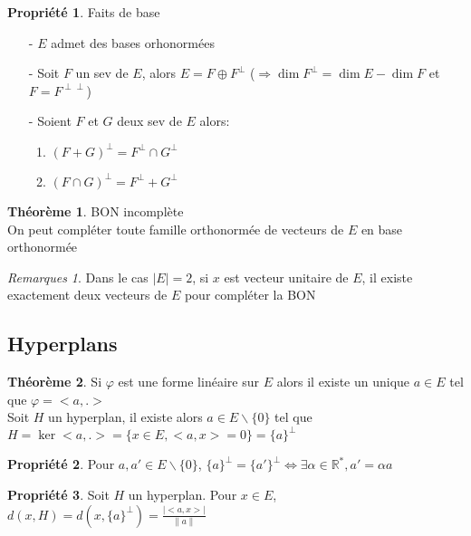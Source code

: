 \documentclass[fleqn]{article}
\theoremstyle{definition} \newtheorem*{defi}{D\'efinition}
\theoremstyle{definition} \newtheorem*{theo}{Th\'eor\`eme}
\theoremstyle{definition} \newtheorem*{coro}{Corollaire}
\theoremstyle{remark} \newtheorem*{rqs}{Remarques}
\theoremstyle{definition} \newtheorem*{prop}{Propri\'et\'e}
\begin{document}
\begin{prop} Faits de base
	\begin{enumerate}
		\item [-] $E$ admet des bases orhonorm\'ees
		\item [-] Soit $F$ un sev de $E$, alors $E = F \oplus F^\perp$ ($\Rightarrow \dim F^\perp = \dim E - \dim F$ et $F=F^{\perp \perp}$)
		\item [-] Soient $F$ et $G$ deux sev de $E$ alors:
			\begin{enumerate}
				\item $(F+G)^\perp = F^\perp \cap G^\perp$
				\item $(F\cap G)^\perp = F^\perp + G^\perp$
			\end{enumerate}
	\end{enumerate}
\end{prop}

\begin{theo} BON incompl\`ete\\
	On peut compl\'eter toute famille orthonorm\'ee de vecteurs de $E$ en base orthonorm\'ee
	\begin{rqs}
		Dans le cas $|E| = 2$, si $x$ est vecteur unitaire de $E$, il existe exactement deux vecteurs de $E$ pour compl\'eter la BON
	\end{rqs}
\end{theo}

\subsection{Hyperplans}

\begin{theo}
	Si $\varphi$ est une forme lin\'eaire sur $E$ alors il existe un unique $a \in E$ tel que $\varphi = <a,.>$ \\
	Soit $H$ un hyperplan, il existe alors $a \in E\backslash \{0\}$ tel que $H = \ker <a,.> = \{x \in E , <a,x> = 0\} = \{a\}^\perp$
\end{theo}

\begin{prop}
	Pour $a,a' \in E\backslash \{0\}$, $\{a\}^\perp = \{a'\}^\perp \Leftrightarrow \exists \alpha \in \mathbb{R}^*, a' = \alpha a$
\end{prop}

\begin{prop}
	Soit $H$ un hyperplan. Pour $x \in E$, $d(x,H) = d(x, \{a\}^\perp) = \frac {|<a,x>|}{\|a\|}$
\end{prop}
\end{document}
